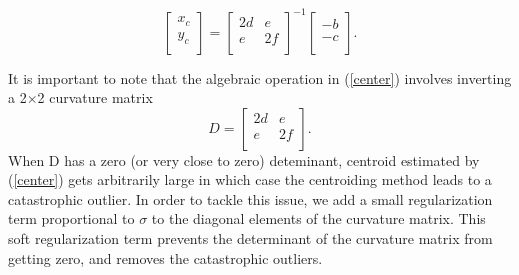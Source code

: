 \documentclass[12pt, preprint]{aastex}
\newcommand{\beq}{\begin{equation}}
\newcommand{\eeq}{\end{equation}}
\begin{document}
\beq
  \begin{bmatrix}
      x_{c}\\
      y_{c}\\
  \end{bmatrix} = 
  \begin{bmatrix}
      2d & e\\
      e & 2f\\
  \end{bmatrix}^{-1}
  \begin{bmatrix}
      -b\\
      -c\\
  \end{bmatrix}.
\label{center}
\eeq

It is important to note that the algebraic operation in (\ref{center}) involves 
inverting a 2$\times$2 curvature matrix
\beq
  D = 
  \begin{bmatrix}
      2d & e\\
      e & 2f\\
  \end{bmatrix}.
\eeq
When D has a zero (or very close to zero) deteminant,
centroid estimated by (\ref{center}) gets arbitrarily 
large in which case the centroiding method leads to a catastrophic 
outlier. In order to tackle this issue, we add a small regularization term
proportional to $\sigma$ to the diagonal elements of the curvature matrix.
This soft regularization term prevents the determinant of the curvature matrix from
getting zero, and removes the catastrophic outliers.
\end{document}
